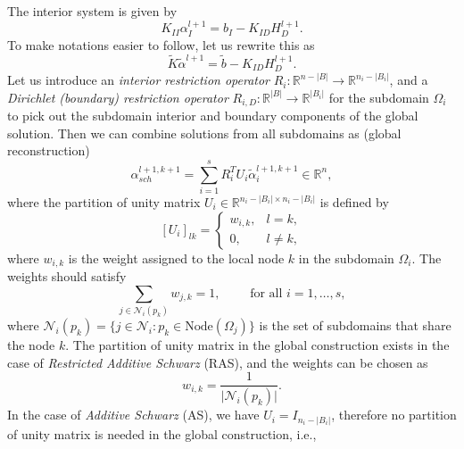 \documentclass[a4paper, 11pt]{article}
\theoremstyle{plain}
\theoremstyle{definition}
\theoremstyle{remark}
\begin{document}
The interior system is given by
\begin{equation*}
    K_{II}\alpha_{I}^{l+1} = b_{I} - K_{ID}H^{l+1}_{D}.
\end{equation*}
To make notations easier to follow, let us rewrite this as
\begin{equation*}
    \boxed{\tilde{K}\tilde{\alpha}^{l+1} = \tilde{b} - K_{ID}H^{l+1}_{D}.}
\end{equation*}
Let us introduce an \textit{interior restriction operator} $R_{i}: \mathbb{R}^{n - \lvert B\rvert} \to \mathbb{R}^{n_{i} - \lvert B_{i}\rvert}$, and a \textit{Dirichlet (boundary) restriction operator} $R_{i, D}: \mathbb{R}^{\lvert B\rvert} \to \mathbb{R}^{\lvert B_{i}\rvert}$ for the subdomain $\Omega_{i}$ to pick out 
the subdomain interior and boundary components of the global solution. Then we can combine solutions from all subdomains as (global reconstruction)
\begin{equation*}
    \alpha_{sch}^{l+1, k+1} = \sum_{i = 1}^{s}R_{i}^{T}U_{i}\tilde{\alpha}^{l+1, k + 1}_{i}\in \mathbb{R}^{n},
\end{equation*}
where the partition of unity matrix $U_{i}\in \mathbb{R}^{n_{i} - \lvert B_{i}\rvert \times n_{i} - \lvert B_{i}\rvert}$ is defined by
\begin{equation*}
    \left[U_{i}\right]_{lk} = 
    \begin{cases}
        w_{i, k}, & l=k,\\
        0, & l\neq k,
    \end{cases}
\end{equation*}
where $w_{i, k}$ is the weight assigned to the local node $k$ in the subdomain $\Omega_{i}$. The weights should satisfy
\begin{equation*}
    \sum_{j\in\mathcal{N}_{i}(p_{k})}w_{j, k} = 1, \qquad \text{ for all } i = 1, \ldots, s,
\end{equation*}
where $\mathcal{N}_{i}(p_{k}) = \{j\in \mathcal{N}_{i}: p_k\in \text{Node}(\Omega_{j})\}$ is the set of subdomains that share the node $k$.
The partition of unity matrix in the global construction exists in the case of \textit{Restricted Additive Schwarz} (RAS), and the weights can be chosen as
\begin{equation*}
    w_{i, k} = \dfrac{1}{\lvert \mathcal{N}_{i}(p_{k})\rvert}.
\end{equation*}
In the case of \textit{Additive Schwarz} (AS), we have $U_{i} = I_{n_{i} - \lvert B_{i}\rvert}$, therefore no partition of unity matrix is needed 
in the global construction, i.e.,
\end{document}
